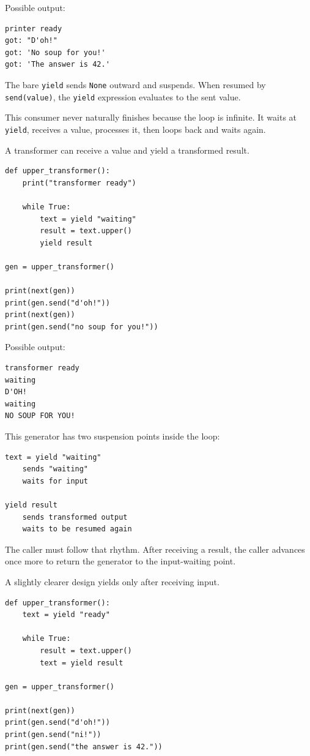 Possible output:

\begin{verbatim}
printer ready
got: "D'oh!"
got: 'No soup for you!'
got: 'The answer is 42.'
\end{verbatim}

The bare \texttt{yield} sends \texttt{None} outward and suspends. When resumed by \texttt{send(value)}, the \texttt{yield} expression evaluates to the sent value.

This consumer never naturally finishes because the loop is infinite. It waits at \texttt{yield}, receives a value, processes it, then loops back and waits again.

A transformer can receive a value and yield a transformed result.

\begin{verbatim}
def upper_transformer():
    print("transformer ready")

    while True:
        text = yield "waiting"
        result = text.upper()
        yield result

gen = upper_transformer()

print(next(gen))
print(gen.send("d'oh!"))
print(next(gen))
print(gen.send("no soup for you!"))
\end{verbatim}

Possible output:

\begin{verbatim}
transformer ready
waiting
D'OH!
waiting
NO SOUP FOR YOU!
\end{verbatim}

This generator has two suspension points inside the loop:

\begin{verbatim}
text = yield "waiting"
    sends "waiting"
    waits for input

yield result
    sends transformed output
    waits to be resumed again
\end{verbatim}

The caller must follow that rhythm. After receiving a result, the caller advances once more to return the generator to the input-waiting point.

A slightly clearer design yields only after receiving input.

\begin{verbatim}
def upper_transformer():
    text = yield "ready"

    while True:
        result = text.upper()
        text = yield result

gen = upper_transformer()

print(next(gen))
print(gen.send("d'oh!"))
print(gen.send("ni!"))
print(gen.send("the answer is 42."))
\end{verbatim}

